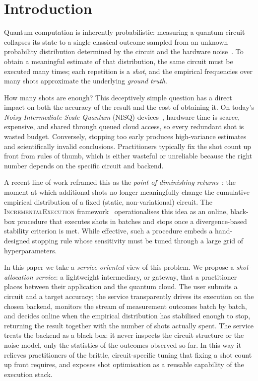 \documentclass[runningheads]{llncs}
\begin{document}
\section{Introduction}
\label{sec:intro}

Quantum computation is inherently probabilistic: measuring a quantum circuit
collapses its state to a single classical outcome sampled from an unknown
probability distribution determined by the circuit and the hardware
noise~\cite{nielsen2010quantum}. To obtain a meaningful estimate of that
distribution, the same circuit must be executed many times; each repetition is a
\emph{shot}, and the empirical frequencies over many shots approximate the
underlying \emph{ground truth}.

How many shots are enough? This deceptively simple question has a direct impact
on both the accuracy of the result and the cost of obtaining it. On today's
\emph{Noisy Intermediate-Scale Quantum} (NISQ) devices~\cite{preskill2018nisq},
hardware time is scarce, expensive, and shared through queued cloud access, so
every redundant shot is wasted budget. Conversely, stopping too early produces
high-variance estimates and scientifically invalid conclusions. Practitioners
typically fix the shot count up front from rules of thumb, which is either
wasteful or unreliable because the right number depends on the specific circuit
and backend.

A recent line of work reframed this as the \emph{point of diminishing
returns}~\cite{bisicchia2026shots}: the moment at which additional shots no
longer meaningfully change the cumulative empirical distribution of a fixed
(static, non-variational) circuit. The \textsc{IncrementalExecution}
framework~\cite{bisicchia2026shots} operationalises this idea as an online,
black-box procedure that executes shots in batches and stops once a
divergence-based stability criterion is met. While effective, such a procedure
embeds a hand-designed stopping rule whose sensitivity must be tuned through a
large grid of hyperparameters.

In this paper we take a \emph{service-oriented} view of this problem. We propose a
\emph{shot-allocation service}: a lightweight intermediary, or gateway, that a
practitioner places between their application and the quantum cloud. The user
submits a circuit and a target accuracy; the service transparently drives its
execution on the chosen backend, monitors the stream of measurement outcomes
batch by batch, and decides online when the empirical distribution has stabilised
enough to stop, returning the result together with the number of shots actually
spent. The service treats the backend as a black box: it never inspects the
circuit structure or the noise model, only the statistics of the outcomes
observed so far. In this way it relieves practitioners of the brittle,
circuit-specific tuning that fixing a shot count up front requires, and exposes
shot optimisation as a reusable capability of the execution stack.
\end{document}
